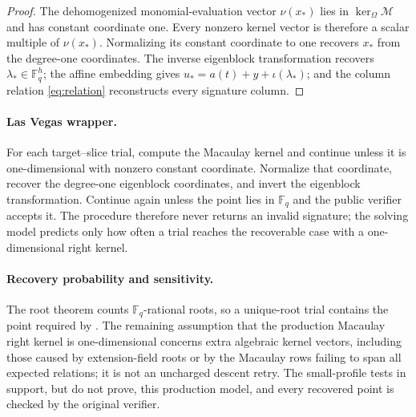\documentclass[11pt]{article}
\newcommand{\F}{\mathbb F}
\begin{document}
\begin{proof}
The dehomogenized monomial-evaluation vector $\nu(x_*)$ lies in
$\ker_\Omega\mathcal M$ and has constant coordinate one.  Every nonzero
kernel vector is therefore a scalar multiple of $\nu(x_*)$.  Normalizing its
constant coordinate to one recovers $x_*$ from the degree-one coordinates.  The
inverse eigenblock transformation recovers $\lambda_*\in\F_q^h$; the affine
embedding gives $u_*=a(t)+y+\iota(\lambda_*)$; and the column relation
\eqref{eq:relation} reconstructs every signature column.
\end{proof}

\paragraph{Las Vegas wrapper.}
For each target--slice trial, compute the Macaulay kernel and continue unless
it is one-dimensional with nonzero constant coordinate.  Normalize that
coordinate, recover the degree-one eigenblock coordinates, and invert the
eigenblock transformation.  Continue again unless the point lies in $\F_q$
and the public verifier accepts it.  The procedure therefore never returns an
invalid signature; the solving model predicts only how often a trial reaches
the recoverable case with a one-dimensional right kernel.

\paragraph{Recovery probability and sensitivity.}
The root theorem counts $\F_q$-rational roots, so a unique-root trial contains
the point required by .  The remaining assumption
that the production Macaulay right kernel is
one-dimensional concerns extra algebraic kernel vectors, including those
caused by extension-field roots or by the Macaulay rows failing to span all
expected relations; it is not an uncharged descent retry.  The small-profile
tests in  support, but do not prove, this production model,
and every recovered point is checked by the original verifier.
\end{document}
